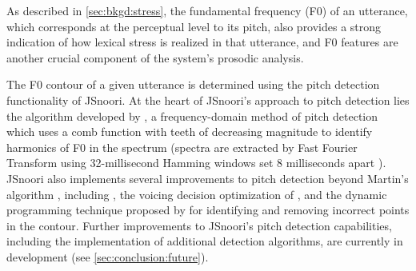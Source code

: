 	
	As described in \cref{sec:bkgd:stress}, the fundamental frequency (F0) of an utterance, which corresponds at the perceptual level to its pitch, also provides a strong indication of how lexical stress is realized in that utterance, and F0 features 
	are another crucial component of
	the system's prosodic analysis. 
	
	
	The F0 contour of a given utterance is determined using the pitch detection 
	functionality of 
	JSnoori. At the heart of JSnoori's approach to pitch detection lies the algorithm developed by \textcite{Martin1982}, a frequency-domain method of pitch detection which uses a comb function with teeth of decreasing magnitude to identify harmonics of F0 in the spectrum (spectra are extracted by Fast Fourier Transform using 32-millisecond Hamming windows set 8 milliseconds apart ). JSnoori also implements several improvements to pitch detection beyond Martin's algorithm \citep{DiMartino1999}, including , the voicing decision optimization of   \textcite{Secrest1983}, and the dynamic programming technique proposed by \textcite{Ney1981} for identifying and removing incorrect points in the contour. Further improvements to JSnoori's pitch detection capabilities, including the implementation of additional detection algorithms, are currently in development (see \cref{sec:conclusion:future}).
	
